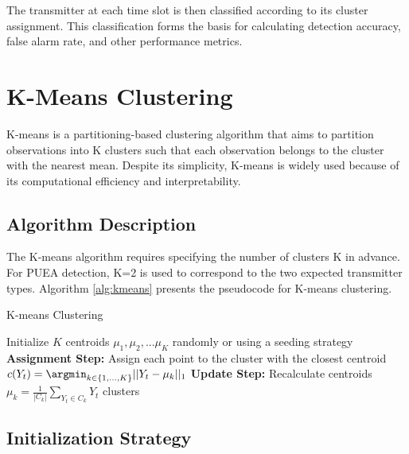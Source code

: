 The transmitter at each time slot is then classified according to its cluster assignment. This classification forms the basis for calculating detection accuracy, false alarm rate, and other performance metrics.

\section{\texorpdfstring{\large\textbf{K-Means Clustering}}{K-Means Clustering}}
\begin{tcolorbox}[enhanced, colback=green!5, colframe=green!75!black, title=About K-Means, sharp corners]
K-means is a partitioning-based clustering algorithm that aims to partition observations into K clusters such that each observation belongs to the cluster with the nearest mean. Despite its simplicity, K-means is widely used because of its computational efficiency and interpretability.
\end{tcolorbox}

\subsection{Algorithm Description}

The K-means algorithm requires specifying the number of clusters K in advance. For PUEA detection, K=2 is used to correspond to the two expected transmitter types. Algorithm \ref{alg:kmeans} presents the pseudocode for K-means clustering.

\begin{algorithm}
\caption{K-means Clustering}
\label{alg:kmeans}
\begin{algorithmic}[1]
    \State Initialize $K$ centroids $\mu_1, \mu_2, ... \mu_K$ randomly or using a seeding strategy
        \State \textbf{Assignment Step:} Assign each point to the cluster with the closest centroid
            \State $c(Y_t) = \argmin_{k \in \{1,...,K\}} ||Y_t - \mu_k||_1$ 
        \EndFor
        \State \textbf{Update Step:} Recalculate centroids
            \State $\mu_k = \frac{1}{|C_k|}\sum_{Y_t \in C_k} Y_t$ 
        \EndFor
    \EndWhile
    \State \Return clusters
\EndProcedure
\end{algorithmic}
\end{algorithm}

\subsection{Initialization Strategy}


